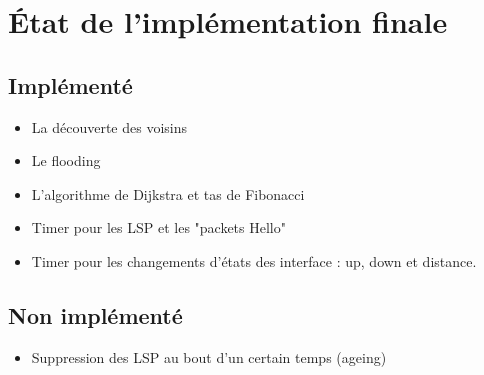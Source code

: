 \documentclass[a4paper, 12pt]{article}
\begin{document}
\section{État de l'implémentation finale} 
\subsection{Implémenté}
\begin{itemize}
\item 
La découverte des voisins
\item
Le flooding
\item
L'algorithme de Dijkstra et tas de Fibonacci
\item
Timer pour les LSP et les "packets Hello"
\item Timer pour les changements d'états des interface : up, down et distance.
\end{itemize}
 \subsection{Non implémenté}
\begin{itemize}
\item 
Suppression des LSP au bout d'un certain temps (ageing)
\end{itemize}
\end{document}
